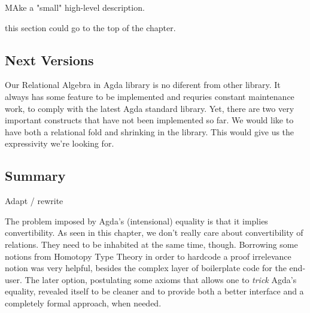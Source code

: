 \begin{TODO}
  \item MAke a "small" high-level description.
  \item this section could go to the top of the chapter.
\end{TODO}

\subsection{Next Versions}

Our Relational Algebra in Agda library is no diferent from other library. It always has some
feature to be implemented and requries constant maintenance work, to comply with the latest
Agda standard library. Yet, there are two very important constructs that have not been implemented so far.
We would like to have both a relational fold and shrinking\cite{Mu2012} in the library. This would give us the
expressivity we're looking for.

\subsection{Summary}

\begin{TODO}
  \item Adapt / rewrite
\end{TODO}

The problem imposed by Agda's (intensional) equality is that it implies
convertibility. As seen in this chapter, we don't really care about convertibility of relations.
They need to be inhabited at the same time, though. 
Borrowing some notions from Homotopy Type Theory\cite{hottbook}
in order to hardcode a proof irrelevance notion was very helpful, besides the complex layer of boilerplate
code for the end-user. The later option, postulating some axioms that allows one to \emph{trick}
Agda's equality, revealed itself to be cleaner and to provide both a better interface
and a completely formal approach, when needed.


